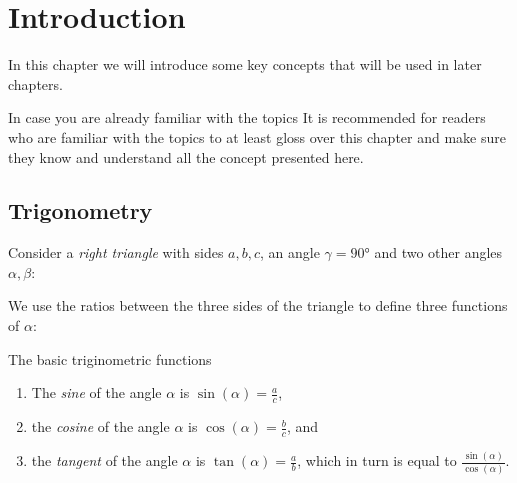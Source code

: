 \chapter{Introduction}
In this chapter we will introduce some key concepts that will be used in later chapters.

\begin{note}{In case you are already familiar with the topics}{}
	It is recommended for readers who are familiar with the topics to at least gloss over this chapter and make sure they know and understand all the concept presented here.
\end{note}

\section{Trigonometry}
Consider a \emph{right triangle} with sides $a,b,c$, an angle $\gamma=\ang{90}$ and two other angles $\alpha,\beta$:

\centering
{}
\flushleft

We use the ratios between the three sides of the triangle to define three functions of $\alpha$:
\begin{definition}{The basic triginometric functions}{}
	\vspace{5mm}
	\begin{enumerate}
		\item The \emph{sine} of the angle $\alpha$ is $\sin(\alpha)=\frac{a}{c}$,
		\item the \emph{cosine} of the angle $\alpha$ is $\cos(\alpha)=\frac{b}{c}$, and
		\item the \emph{tangent} of the angle $\alpha$ is $\tan(\alpha)=\frac{a}{b}$, which in turn is equal to $\frac{\sin(\alpha)}{\cos(\alpha)}$.
		\end{enumerate}
	\label{def:basic_trig}
\end{definition}

